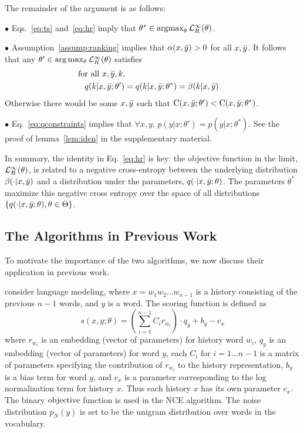 \documentclass[11pt,a4paper]{article}
\newcommand{\objri}{{\cal L}_R^{\infty}}
\DeclareMathOperator*{\argmax}{argmax}
\newcommand{\loss}{\hbox{objective}}
\begin{document}
The remainder of the argument is as follows:


$\bullet$ Eqs.~\ref{eq:ts} and~\ref{eq:hr} imply that $\theta^* \in \argmax_\theta \objri(\theta)$.

$\bullet$ Assumption~\ref{assump:ranking} implies that $\alpha(x, \bar{y}) >
  0$ for all $x, \bar{y}$. It follows that any $\theta' \in \arg\max_\theta \objri(\theta)$
satisfies
\begin{eqnarray}
\hbox{for all $x, \bary, k, \hspace{4cm}$} && \label{eq:qconstraints}
\\
q(k | x, \bary; \theta') = q(k | x, \bary;
\theta^*) = \beta(k | x, \bary) \nonumber
\end{eqnarray}
Otherwise there would be some $x, \bar{y}$ such that $\hbox{C}(x, \bar{y}; \theta') < \hbox{C}(x, \bar{y}; \theta^*)$.

$\bullet$ Eq.~\ref{eq:qconstraints} implies that $\forall x, y$, $p(y
  | x; \theta') = p(y | x; \theta^*)$. See the proof of lemma~\ref{lem:iden}
  in the supplementary material.


In summary, the identity in Eq.~\ref{eq:hr} is key: the objective
function in the limit, $\objri(\theta)$, is
related to a negative cross-entropy between the
underlying distribution $\beta(\cdot|x, \bar{y})$ and a distribution
under the parameters, $q(\cdot|x, \bar{y}; \theta)$. The parameters $\theta^*$
maximize this negative cross entropy over the space of all
distributions $\{q(\cdot|x, \bar{y}; \theta), \theta \in \Theta \}$. 






 
\subsection{The Algorithms in Previous Work}

\label{related}

To motivate the importance of the two algorithms, we
now discuss their application in previous work.

\citet{mnih2012fast} consider language modeling, where $x = w_1 w_2
\ldots w_{n-1}$ is a history consisting of the previous $n-1$ words,
and $y$ is a word. The scoring function is defined as
\[
s(x, y; \theta) = (\sum_{i=1}^{n-1} C_i r_{w_i}) \cdot q_y + b_y - c_x
\]
where $r_{w_i}$ is an embedding (vector of parameters) for history
word $w_i$, $q_y$ is an embedding (vector of parameters) for word $y$,
each $C_i$ for $i = 1 \ldots n-1$ is a matrix of parameters specifying
the contribution of $r_{w_i}$ to the history representation, $b_y$ is
a bias term for word $y$, and $c_x$ is a parameter corresponding to
the log normalization term for history $x$. Thus each history $x$ has
its own parameter $c_x$. The binary $\loss$ function is used in the NCE
algorithm. The noise distribution $p_N(y)$ is set to be the unigram
distribution over words in the vocabulary.
\end{document}
